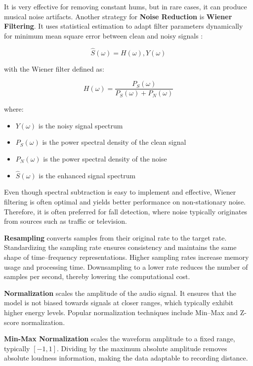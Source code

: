 \documentclass[11pt, a4paper, twoside]{article}
\begin{document}
It is very effective for removing constant hums, but in rare cases, it can produce musical noise artifacts. Another strategy for \textbf{Noise Reduction} is \textbf{Wiener Filtering}. It uses statistical estimation to adapt filter parameters dynamically for minimum mean square error between clean and noisy signals \cite{pranami2016audio}:

\begin{equation}
\hat{S}(\omega) = H(\omega),Y(\omega)
\end{equation}

with the Wiener filter defined as:

\begin{equation}
H(\omega) = \frac{P_S(\omega)}{P_S(\omega) + P_N(\omega)}
\end{equation}

where:
\begin{itemize}
\item $Y(\omega)$ is the noisy signal spectrum
\item $P_S(\omega)$ is the power spectral density of the clean signal
\item $P_N(\omega)$ is the power spectral density of the noise
\item $\hat{S}(\omega)$ is the enhanced signal spectrum
\end{itemize}

Even though spectral subtraction is easy to implement and effective, Wiener filtering is often optimal and yields better performance on non-stationary noise. Therefore, it is often preferred for fall detection, where noise typically originates from sources such as traffic or television.

\textbf{Resampling} converts samples from their original rate to the target rate. Standardizing the sampling rate ensures consistency and maintains the same shape of time–frequency representations. Higher sampling rates increase memory usage and processing time. Downsampling to a lower rate reduces the number of samples per second, thereby lowering the computational cost.

\textbf{Normalization} scales the amplitude of the audio signal. It ensures that the model is not biased towards signals at closer ranges, which typically exhibit higher energy levels. Popular normalization techniques include Min–Max and Z-score normalization.

\textbf{Min-Max Normalization} scales the waveform amplitude to a fixed range, typically $[-1, 1]$. Dividing by the maximum absolute amplitude removes absolute loudness information, making the data adaptable to recording distance.
\end{document}
